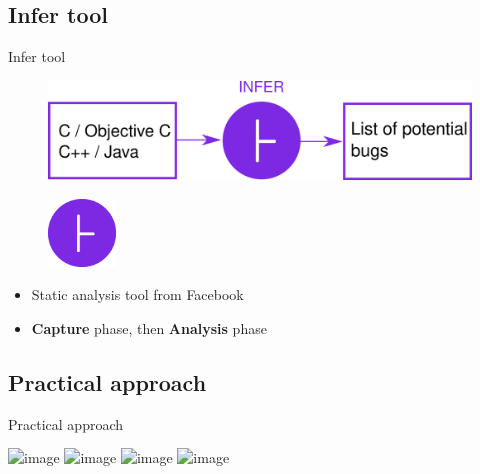 \documentclass{beamer}
\begin{document}
\subsection{Infer tool}

\begin{frame}{Infer tool}

\begin{figure}
\includegraphics[width=\textwidth]{Figures/InferDrawing.png}
\end{figure}

\end{frame}

\begin{frame}

\begin{figure}
\includegraphics[width = 1.8cm]{Figures/InferLogo.png}

\end{figure}

\vspace{1cm}

\begin{itemize}
\item Static analysis tool from Facebook
\item \textbf{Capture} phase, then \textbf{Analysis} phase
\end{itemize}

\end{frame}


\subsection{Practical approach}



\begin{frame}{Practical approach}

\includegraphics<1>[scale=0.3]{Figures/Workflow/1.png}
\includegraphics<2>[scale=0.3]{Figures/Workflow/2.png}
\includegraphics<3>[scale=0.3]{Figures/Workflow/3.png}
\includegraphics<4>[scale=0.3]{Figures/Workflow/4.png}

\end{frame}
\end{document}
